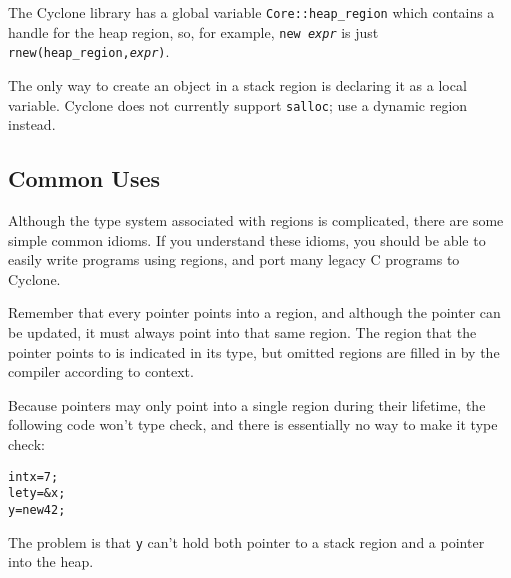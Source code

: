 The Cyclone library has a global variable \texttt{Core::heap_region}
which contains a handle for the heap region, so, for example,
\texttt{new {\it expr}} is just \texttt{rnew(heap_region,{\it expr})}.

The only way to create an object in a stack region is declaring it as
a local variable.  Cyclone does not currently support \texttt{salloc};
use a dynamic region instead.

\subsection{Common Uses}

Although the type system associated with regions is complicated, there
are some simple common idioms.  If you understand these idioms, you
should be able to easily write programs using regions, and port many
legacy C programs to Cyclone.

Remember that every pointer points into a region, and although the
pointer can be updated, it must always point into that same region.
The region that the pointer points to is indicated in its type, but
omitted regions are filled in by the compiler according to context.



Because pointers may only point into a single region during their
lifetime, the following code won't type check, and there is
essentially no way to make it type check:
\begin{alltt}
  int x = 7;
  let y = &x;
  y = new 42;
\end{alltt}
The problem is that \texttt{y} can't hold both pointer to a stack
region and a pointer into the heap.

